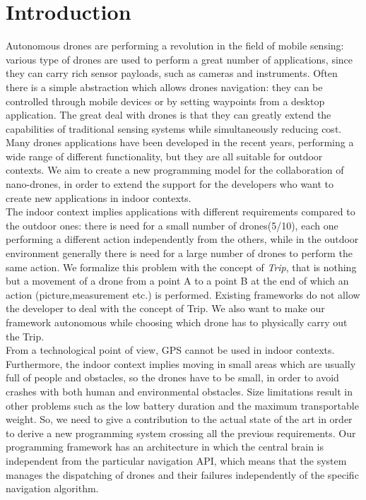 \chapter{Introduction}
\label{cap1}

Autonomous drones are performing a revolution in the field of mobile sensing: various type of drones are used to perform a great number of applications, since they can carry rich sensor payloads, such as cameras and instruments.
Often there is a simple abstraction which allows drones navigation: they can be controlled through mobile devices or by setting waypoints from a desktop application.
The great deal with drones is that they can greatly extend the capabilities of traditional sensing systems while simultaneously reducing cost.
\\

Many drones applications have been developed in the recent years, performing a wide range of different functionality, but they are all suitable for outdoor contexts.
We aim to create a new programming model for the collaboration of nano-drones, in order to extend the support for the developers who want to create new applications in indoor contexts.
\\

The indoor context implies applications with different requirements compared to the outdoor ones:
there is need for a small number of drones(5/10), each one performing a different action independently from the others, while in the outdoor environment generally there is need for a large number of drones to perform the same action.
We formalize this problem with the concept of \textit{Trip}, that is nothing but a movement of a drone from a point A to a point B at the end of which an action (picture,measurement etc.) is performed.
Existing frameworks do not allow the developer to deal with the concept of Trip.
We also want to make our framework autonomous while choosing which drone has to physically carry out the Trip.
\\

From a technological point of view, GPS cannot be used in indoor contexts.
Furthermore, the indoor context implies moving in small areas which are usually full of people and obstacles, so the drones have to be small, in order to avoid crashes with both human and environmental obstacles.
Size limitations result in other problems such as the low battery duration and the maximum transportable weight.
So, we need to give a contribution to the actual state of the art in order to derive a new programming system crossing all the previous requirements.
Our programming framework has an architecture in which the central brain is independent from the particular navigation API, which means that the system manages the dispatching of drones and their failures independently of the specific navigation algorithm.



